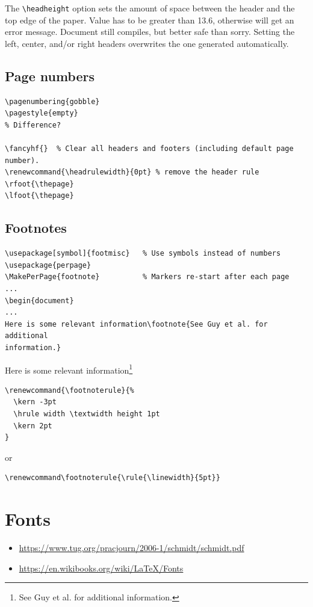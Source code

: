 \documentclass{article}
\begin{document}
The \verb|\headheight| option sets the amount of space between the
header and the top edge of the paper. Value has to be greater than
13.6, otherwise will get an error message. Document still
compiles, but better safe than sorry. Setting the left, center, and/or
right headers overwrites the one generated automatically.

\subsection{Page numbers}
\begin{lstlisting}
\pagenumbering{gobble}
\pagestyle{empty}
% Difference?

\fancyhf{}  % Clear all headers and footers (including default page number).
\renewcommand{\headrulewidth}{0pt} % remove the header rule
\rfoot{\thepage}
\lfoot{\thepage}
\end{lstlisting}

\subsection{Footnotes}
\begin{lstlisting}
\usepackage[symbol]{footmisc}   % Use symbols instead of numbers
\usepackage{perpage}
\MakePerPage{footnote}          % Markers re-start after each page
...
\begin{document}
...
Here is some relevant information\footnote{See Guy et al. for additional
information.}
\end{lstlisting}
Here is some relevant information\footnote{See Guy et al. for additional
information.}

\begin{lstlisting}
\renewcommand{\footnoterule}{%
  \kern -3pt
  \hrule width \textwidth height 1pt
  \kern 2pt
}
\end{lstlisting}
or
\begin{lstlisting}
\renewcommand\footnoterule{\rule{\linewidth}{5pt}}
\end{lstlisting}

\newpage
\section{Fonts}
\begin{itemize}
    \item \url{https://www.tug.org/pracjourn/2006-1/schmidt/schmidt.pdf}
    \item \url{https://en.wikibooks.org/wiki/LaTeX/Fonts}
\end{itemize}
\end{document}
